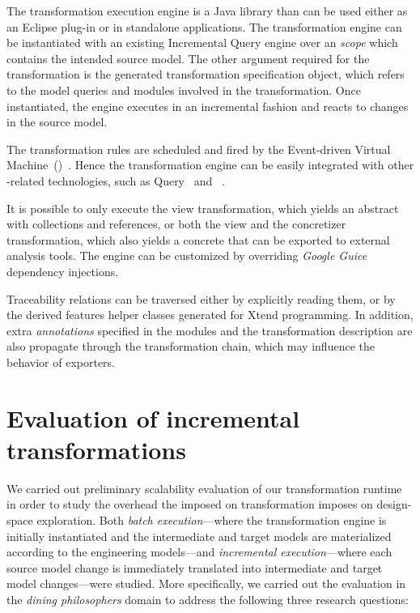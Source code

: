 The transformation execution engine is a Java library than can be used either as an Eclipse plug-in or in standalone applications. The transformation engine can be instantiated with an existing  Incremental Query engine over an \textit{ scope} which contains the intended source model. The other argument required for the transformation is the generated transformation specification object, which refers to the  model queries and  modules involved in the transformation. Once instantiated, the engine executes in an incremental fashion and reacts to changes in the source model.

The transformation rules are scheduled and fired by the  Event-driven Virtual Machine~()~\citep{Bergmann15viatra}. Hence the transformation engine can be easily integrated with other -related technologies, such as  Query~\citep{Ujhelyi15incquery} and ~\citep{Abdeen14multiobjective}.

It is possible to only execute the view transformation, which yields an abstract  with collections and references, or both the view and the concretizer transformation, which also yields a concrete  that can be exported to external analysis tools. The engine can be customized by overriding \emph{Google Guice} dependency injections.

Traceability relations can be traversed either by explicitly reading them, or by the derived features helper classes generated for Xtend programming. In addition, extra \emph{annotations} specified in the  modules and the transformation description are also propagate through the transformation chain, which may influence the behavior of  exporters.

\section{Evaluation of incremental transformations}

We carried out preliminary scalability evaluation of our transformation runtime in order to study the overhead the imposed on transformation imposes on design-space exploration. Both \emph{batch execution}---where the transformation engine is initially instantiated and the intermediate and target  models are materialized according to the engineering models---and \emph{incremental execution}---where each source model change is immediately translated into intermediate and target model changes---were studied. More specifically, we carried out the evaluation in the \emph{dining philosophers} domain to address the following three research questions:
